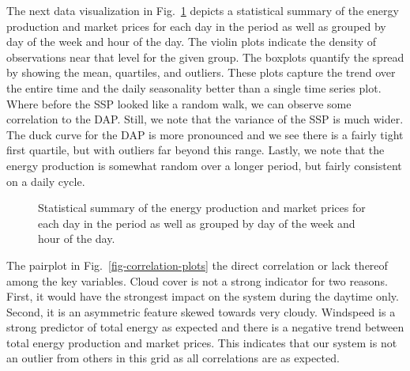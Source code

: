 \documentclass[
  journal,
]{IEEEtran}%
\begin{document}
The next data visualization in Fig.~\ref{fig-violin-plots} depicts a
statistical summary of the energy production and market prices for each
day in the period as well as grouped by day of the week and hour of the
day. The violin plots indicate the density of observations near that
level for the given group. The boxplots quantify the spread by showing
the mean, quartiles, and outliers. These plots capture the trend over
the entire time and the daily seasonality better than a single time
series plot. Where before the SSP looked like a random walk, we can
observe some correlation to the DAP. Still, we note that the variance of
the SSP is much wider. The duck curve for the DAP is more pronounced and
we see there is a fairly tight first quartile, but with outliers far
beyond this range. Lastly, we note that the energy production is
somewhat random over a longer period, but fairly consistent on a daily
cycle.

\begin{figure}


\caption{\label{fig-violin-plots}Statistical summary of the energy
production and market prices for each day in the period as well as
grouped by day of the week and hour of the day.}

\end{figure}%

The pairplot in Fig.~\ref{fig-correlation-plots} the direct correlation
or lack thereof among the key variables. Cloud cover is not a strong
indicator for two reasons. First, it would have the strongest impact on
the system during the daytime only. Second, it is an asymmetric feature
skewed towards very cloudy. Windspeed is a strong predictor of total
energy as expected and there is a negative trend between total energy
production and market prices. This indicates that our system is not an
outlier from others in this grid as all correlations are as expected.
\end{document}
